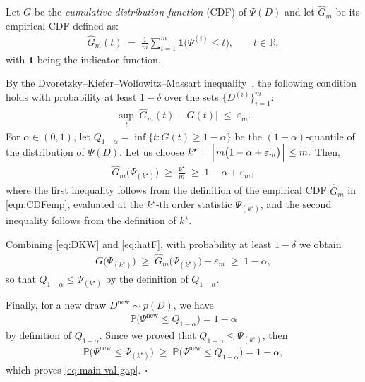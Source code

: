 \documentclass{article}
\newcommand{\CFD}{G}
\begin{document}
Let $\CFD$ be the \emph{cumulative distribution function} (CDF) of $\Psi(D)$ and let $\hat{\CFD}_m$ be its empirical CDF defined as:
\begin{align} \label{eqn:CDFemp}
\hat{\CFD}_m(t) \;=\; \frac{1}{m}\sum_{i=1}^m \mathbf{1}\bigl(\Psi^{(i)} \le t \bigr),
\qquad t \in \mathbb{R},
\end{align}
with $\mathbf{1}$ being the indicator function.

By the Dvoretzky–Kiefer–Wolfowitz–Massart inequality~\cite{massart1990tight}, the following condition holds with probability at least $1-\delta$ over the  sets $\{D^{(i)}\}_{i=1}^m$:
\begin{align}
\sup_{t} \bigl| \hat{\CFD}_m(t) - \CFD(t) \bigr| \;\le\; \varepsilon_m.
\label{eq:DKW}
\end{align}
  For $\alpha \in (0,1)$, let $Q_{1-\alpha} = \inf\{t : \CFD(t) \ge 1-\alpha\}$ be the $(1-\alpha)$-quantile of the distribution of $\Psi(D)$.
Let us choose  $k^\star = \Bigl\lceil m\bigl(1-\alpha + \varepsilon_m \bigr)\Bigr\rceil \le m.$
Then,
\begin{align}
\hat{\CFD}_m\bigl(\Psi_{(k^\star)}\bigr) \;\ge\; \frac{k^\star}{m} \;\ge\; 1-\alpha+\varepsilon_m,
\label{eq:hatF}
\end{align}
where the first inequality follows from the definition of the empirical CDF $\hat{G}_m$ in \eqref{eqn:CDFemp}, evaluated at the $k^\star$-th order statistic $\Psi_{(k^\star)}$, and the second inequality follows from the definition of $k^\star$.

Combining \eqref{eq:DKW} and \eqref{eq:hatF}, with probability at least $1-\delta$ we obtain
\begin{align}
\CFD\bigl(\Psi_{(k^\star)}\bigr)
\;\ge\; \hat{\CFD}_m\bigl(\Psi_{(k^\star)}\bigr) - \varepsilon_m
\;\ge\; 1-\alpha,
\end{align}
so that $Q_{1-\alpha} \le \Psi_{(k^\star)}$ by the definition of $Q_{1-\alpha}$.

Finally, for a new draw $D^{\mathrm{new}}\sim p(D)$, we have
\begin{align}
\mathbb{P}\bigl(\Psi^{\mathrm{new}} \le Q_{1-\alpha}\bigr) = 1-\alpha
\end{align}
by definition of $Q_{1-\alpha}$. Since we proved that  $Q_{1-\alpha}\le \Psi_{(k^\star)}$,  then
\begin{align}
\mathbb{P}\bigl(\Psi^{\mathrm{new}} \le \Psi_{(k^\star)}\bigr)
\;\ge\; \mathbb{P}\bigl(\Psi^{\mathrm{new}} \le Q_{1-\alpha}\bigr)
= 1-\alpha,
\end{align}
which proves \eqref{eq:main-val-gap}.
\hfill$\square$
\end{document}
